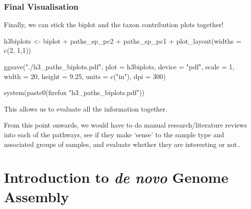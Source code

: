 \documentclass[
  letterpaper,
]{book}
\newenvironment{Shaded}{}{}
\newcommand{\AttributeTok}[1]{\textcolor[rgb]{0.84,0.23,0.29}{#1}}
\newcommand{\DecValTok}[1]{\textcolor[rgb]{0.00,0.36,0.77}{#1}}
\newcommand{\FloatTok}[1]{\textcolor[rgb]{0.00,0.36,0.77}{#1}}
\newcommand{\FunctionTok}[1]{\textcolor[rgb]{0.44,0.26,0.76}{#1}}
\newcommand{\NormalTok}[1]{\textcolor[rgb]{0.14,0.16,0.18}{#1}}
\newcommand{\OtherTok}[1]{\textcolor[rgb]{0.44,0.26,0.76}{#1}}
\newcommand{\SpecialCharTok}[1]{\textcolor[rgb]{0.00,0.36,0.77}{#1}}
\newcommand{\StringTok}[1]{\textcolor[rgb]{0.01,0.18,0.38}{#1}}
\begin{document}
\hypertarget{final-visualisation}{%
\subsection{Final Visualisation}\label{final-visualisation}}

Finally, we can stick the biplot and the taxon contribution plots
together!

\begin{Shaded}
\begin{Highlighting}[]
\NormalTok{h3biplots }\OtherTok{\textless{}{-}}\NormalTok{ biplot }\SpecialCharTok{+}\NormalTok{ paths\_sp\_pc2 }\SpecialCharTok{+}\NormalTok{ paths\_sp\_pc1 }\SpecialCharTok{+}
  \FunctionTok{plot\_layout}\NormalTok{(}\AttributeTok{widths =} \FunctionTok{c}\NormalTok{(}\DecValTok{2}\NormalTok{, }\DecValTok{1}\NormalTok{,}\DecValTok{1}\NormalTok{))}

\FunctionTok{ggsave}\NormalTok{(}\StringTok{"./h3\_paths\_biplots.pdf"}\NormalTok{, }\AttributeTok{plot =}\NormalTok{ h3biplots,}
        \AttributeTok{device =} \StringTok{"pdf"}\NormalTok{, }\AttributeTok{scale =} \DecValTok{1}\NormalTok{, }\AttributeTok{width =} \DecValTok{20}\NormalTok{, }\AttributeTok{height =} \FloatTok{9.25}\NormalTok{, }\AttributeTok{units =} \FunctionTok{c}\NormalTok{(}\StringTok{"in"}\NormalTok{), }\AttributeTok{dpi =} \DecValTok{300}\NormalTok{)}

\FunctionTok{system}\NormalTok{(}\FunctionTok{paste0}\NormalTok{(}\StringTok{\textquotesingle{}firefox "h3\_paths\_biplots.pdf"\textquotesingle{}}\NormalTok{))}
\end{Highlighting}
\end{Shaded}

This allows us to evaluate all the information together.

From this point onwards, we would have to do manual research/literature
reviews into each of the pathways, see if they make `sense' to the
sample type and associated groups of samples, and evaluate whether they
are interesting or not..

\hypertarget{introduction-to-de-novo-genome-assembly}{%
\chapter{\texorpdfstring{Introduction to \emph{de novo} Genome
Assembly}{Introduction to de novo Genome Assembly}}\label{introduction-to-de-novo-genome-assembly}}
\end{document}
